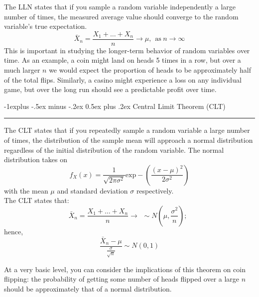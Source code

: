 \documentclass[letterpaper, 10.5pt,landscape]{article}
\makeatletter
\renewcommand{\subsection}{\@startsection{subsection}{2}{0mm}%
                                {-1explus -.5ex minus -.2ex}%
                                {0.5ex plus .2ex}%
                                {\normalfont\normalsize\bfseries}}
\makeatother
\begin{document}
\begin{multicols*}{3}
The LLN states that if you sample a random variable independently a large number of times, the measured average value should converge to the random variable's true expectation.
\vspace{-3pt}
\[\boxed{\bar{X}_{n} = \frac{X_{1} + \ldots + X_{n}}{n} \rightarrow \mu, \hspace{5pt} \text{as} \hspace{3pt} n \rightarrow \infty}\]
This is important in studying the longer-term behavior of random variables over time. As an example, a coin might land on heads 5 times in a row, but over a much larger $n$ we would expect the proportion of heads to be approximately half of the total flips. Similarly, a casino might experience a loss on any individual game, but over the long run should see a predictable profit over time.



\subsection{Central Limit Theorem (CLT)} {\color{teal}\hrule height 0.5pt} \smallskip

The CLT states that if you repeatedly sample a random variable a large number of times, the distribution of the sample mean will approach a normal distribution regardless of the initial distribution of the random variable. The normal distribution takes on 
\vspace{-3pt}
\[\boxed{f_{X}(x) = \frac{1}{\sqrt{2\pi\sigma^{2} }} \text{exp}-\left(\frac{(x-\mu)^{2}}{2\sigma^{2}} \right)}\] 
\vspace{-3pt}
with the mean $\mu$ and standard deviation $\sigma$ respectively. \\


\vspace{5pt}
The CLT states that: 
\vspace{-3pt}
\[\boxed{\bar{X}_{n} = \frac{X_{1} + \ldots + X_{n}} {n} \rightarrow \hspace{5pt} \sim N\left(\mu, \frac{\sigma^{2}}{n} \right) ; \hspace{5pt}}\]  
\vspace{-5pt}
hence,
\vspace{-5pt}
\[\boxed{\frac{\bar{X}_{n} - \mu}{\frac{\sigma}{\sqrt{n}}} \sim N(0,1)}\]

At a very basic level, you can consider the implications of this theorem on coin flipping: the probability of getting some number of heads flipped over a large $n$ should be approximately that of a normal distribution. \\


\end{multicols*}
\end{document}
